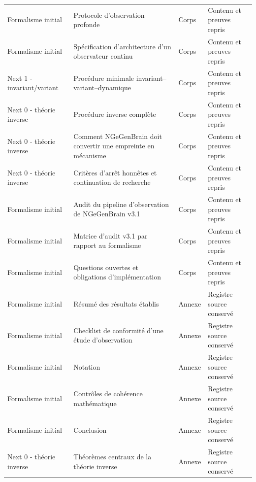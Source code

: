 \documentclass[11pt,oneside]{book}
\theoremstyle{definition}
\theoremstyle{remark}
\newcommand{\1}{\mathbf 1}
\begin{document}
\begin{longtable}{>{\raggedright\arraybackslash}p{} >{\raggedright\arraybackslash}p{} >{\raggedright\arraybackslash}p{} >{\raggedright\arraybackslash}p{}}
Formalisme initial & Protocole d'observation profonde & Corps & Contenu et preuves repris \\

Formalisme initial & Spécification d'architecture d'un observateur continu & Corps & Contenu et preuves repris \\

Next 1 - invariant/variant & Procédure minimale invariant--variant--dynamique & Corps & Contenu et preuves repris \\

Next 0 - théorie inverse & Procédure inverse complète & Corps & Contenu et preuves repris \\

Next 0 - théorie inverse & Comment NGeGenBrain doit convertir une empreinte en mécanisme & Corps & Contenu et preuves repris \\

Next 0 - théorie inverse & Critères d'arrêt honnêtes et continuation de recherche & Corps & Contenu et preuves repris \\

Formalisme initial & Audit du pipeline d'observation de NGeGenBrain v3.1 & Corps & Contenu et preuves repris \\

Formalisme initial & Matrice d'audit v3.1 par rapport au formalisme & Corps & Contenu et preuves repris \\

Formalisme initial & Questions ouvertes et obligations d'implémentation & Corps & Contenu et preuves repris \\

Formalisme initial & Résumé des résultats établis & Annexe & Registre source conservé \\

Formalisme initial & Checklist de conformité d'une étude d'observation & Annexe & Registre source conservé \\

Formalisme initial & Notation & Annexe & Registre source conservé \\

Formalisme initial & Contrôles de cohérence mathématique & Annexe & Registre source conservé \\

Formalisme initial & Conclusion & Annexe & Registre source conservé \\

Next 0 - théorie inverse & Théorèmes centraux de la théorie inverse & Annexe & Registre source conservé \\


\end{longtable}
\end{document}
